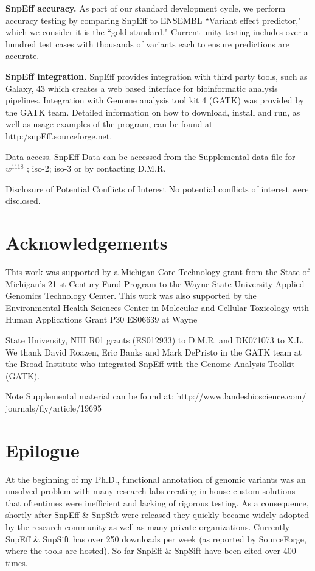 \textbf{SnpEff accuracy.} As part of our standard development cycle, we perform accuracy testing by comparing SnpEff to ENSEMBL ``Variant effect predictor," which we consider it is the ``gold standard." Current unity testing includes over a hundred test cases with thousands of variants each to ensure predictions are accurate.

\textbf{SnpEff integration.} SnpEff provides integration with third party tools, such as Galaxy, 43 which creates a web based interface for bioinformatic analysis pipelines.  Integration with Genome analysis tool kit 4 (GATK) was provided by the GATK team.  Detailed information on how to download, install and run, as well as usage examples of the program, can be found at http:/snpEff.sourceforge.net.  

Data access. SnpEff Data can be accessed from the Supplemental data file for $w^{1118}$ ; iso-2; iso-3 or by contacting D.M.R.

Disclosure of Potential Conflicts of Interest No potential conflicts of interest were disclosed.


\section{Acknowledgements}

This work was supported by a Michigan Core Technology grant from the State of Michigan’s 21 st Century Fund Program to the Wayne State University Applied Genomics Technology Center. This work was also supported by the Environmental Health Sciences Center in Molecular and Cellular Toxicology with Human Applications Grant P30 ES06639 at Wayne

State University, NIH R01 grants (ES012933) to D.M.R. and DK071073 to X.L. We thank David Roazen, Eric Banks and Mark DePristo in the GATK team at the Broad Institute who integrated SnpEff with the Genome Analysis Toolkit (GATK).

Note Supplemental material can be found at: http://www.landesbioscience.com/ journals/fly/article/19695

\section{Epilogue}

At the beginning of my Ph.D., functional annotation of genomic variants was an unsolved problem with many research labs creating in-house custom solutions that oftentimes were inefficient and lacking of rigorous testing. As a consequence, shortly after SnpEff \& SnpSift were released they quickly became widely adopted by the research community as well as many private organizations. Currently SnpEff \& SnpSift has over 250 downloads per week (as reported by  SourceForge, where the tools are hosted). So far SnpEff \& SnpSift  have been cited over 400 times.

